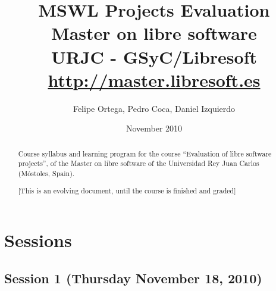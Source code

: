 \documentclass[a4paper]{article}
\title{MSWL Projects Evaluation \\
Master on libre software \\
URJC - GSyC/Libresoft \\
\url{http://master.libresoft.es}}
\author{Felipe Ortega, Pedro Coca, Daniel Izquierdo}
\date{November 2010}
\begin{document}
\maketitle

\begin{abstract}
Course syllabus and learning program for the course ``Evaluation of libre software projects'', of the Master on libre software of the Universidad Rey Juan Carlos (Móstoles, Spain).

[This is an evolving document, until the course is finished and graded]
\end{abstract}

\tableofcontents


\section{Sessions}

\subsection{Session 1 (Thursday November 18, 2010)}
\end{document}
